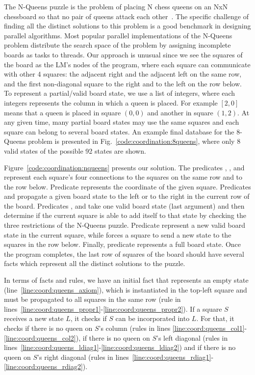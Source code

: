The N-Queens puzzle is the problem of placing N chess queens on an NxN
chessboard so that no pair of queens attack each other~\cite{8queens}. The
specific challenge of finding all the distinct solutions to this problem is a
good benchmark in designing parallel algorithms.  Most popular parallel
implementations of the N-Queens problem distribute the search space of the
problem by assigning incomplete boards as tasks to threads.  Our approach is
unusual since we see the squares of the board as the LM's nodes of the program,
where each square can communicate with other 4 squares: the adjacent right and
the adjacent left on the same row, and the first non-diagonal square to the
right and to the left on the row below. To represent a partial/valid board
state, we use a list of integers, where each integers represents the column in
which a queen is placed. For example $[2, 0]$ means that a queen is placed in
square $(0, 0)$ and another in square $(1, 2)$. At any given time, many partial
board states may use the same squares and each square can belong to several
board states. An example final database for the 8-Queens problem is presented in
Fig.~\ref{code:coordination:8queens}, where only 8 valid states of the possible
92 states are shown.

Figure~\ref{code:coordination:nqueens} presents our solution. The predicates
, ,  and  represent each
square's four connections to the squares on the same row and to the row below.
Predicate  represents the coordinate of the given square.
Predicates  and  propagate a given
board state to the left or to the right in the current row of the board.
Predicates ,  and  take
one valid board state (last argument) and then determine if the current square
is able to add itself to that state by checking the three restrictions of the
N-Queens puzzle. Predicate  represent a new valid board state in
the current square, while  forces a square to send a new state
to the squares in the row below. Finally, predicate 
represents a full board state. Once the program completes, the last row of
squares of the board should have several  facts which
represent all the distinct solutions to the puzzle.

In terms of facts and rules, we have an initial fact that represents an empty
state (line~\ref{line:coord:queens_axiom}), which is instantiated in the
top-left square and must be propagated to all squares in the same row (rule in
lines~\ref{line:coord:queens_propr1}-\ref{line:coord:queens_propr2}). If a
square $S$ receives a new state $L$, it checks if $S$ can be incorporated into
$L$. For that, it checks if there is no queen on $S$'s column (rules in lines
\ref{line:coord:queens_col1}-\ref{line:coord:queens_col2}), if there is no queen
on $S$'s left diagonal (rules in
lines~\ref{line:coord:queens_ldiag1}-\ref{line:coord:queens_ldiag2}) and if
there is no queen on $S$'s right diagonal (rules in
lines~\ref{line:coord:queens_rdiag1}-\ref{line:coord:queens_rdiag2}).

